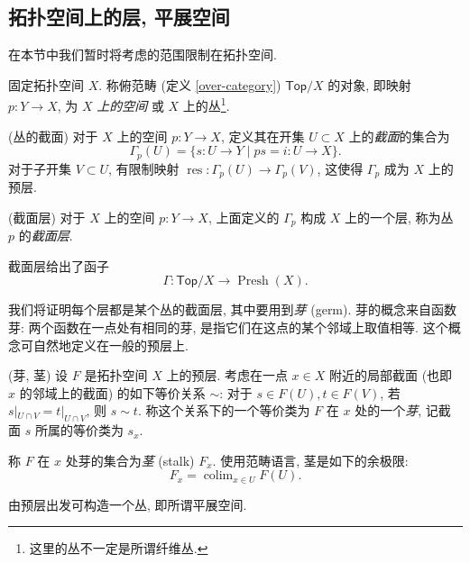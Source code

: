 


\subsection{拓扑空间上的层, 平展空间}

在本节中我们暂时将考虑的范围限制在拓扑空间.

固定拓扑空间 $X$. 称俯范畴 (定义 \ref{over-category}) $\mathsf {Top}/X$ 的对象, 即映射 $p \colon Y \to X$, 为 $X$ \emph{上的空间} 或 $X$ 上的丛\footnote{这里的丛不一定是所谓纤维丛.}.

\begin{definition}
    {(丛的截面)}
    对于 $X$ 上的空间 $p \colon Y\to X$, 定义其在开集 $U\subset X$ 上的\emph{截面}的集合为
    $$
    \Gamma_p(U)=
    \big\{
        s \colon U \to Y \mid ps=i\colon U \to X
    \big\}.
    $$
    对于子开集 $V\subset U$, 有限制映射 $\operatorname{res}\colon \Gamma_p(U) \to \Gamma_p(V)$, 这使得 $\Gamma_p$ 成为 $X$ 上的预层.
\end{definition}

\begin{propdef}
    {(截面层)}
    对于 $X$ 上的空间 $p \colon Y\to X$, 上面定义的 $\Gamma_p$ 构成 $X$ 上的一个层, 称为丛 $p$ 的\emph{截面层}.
    
    截面层给出了函子
    $$\Gamma \colon \mathsf {Top}/X \to \operatorname{Presh}(X).$$
\end{propdef}

我们将证明每个层都是某个丛的截面层, 其中要用到\emph{芽} (germ).
芽的概念来自函数芽: 两个函数在一点处有相同的芽, 是指它们在这点的某个邻域上取值相等. 这个概念可自然地定义在一般的预层上.

\begin{definition}
	[label={germ-and-stalk}]
	{(芽, 茎)}
    设 $F$ 是拓扑空间 $X$ 上的预层. 考虑在一点 $x\in X$ 附近的局部截面 (也即 $x$ 的邻域上的截面) 的如下等价关系 $\sim$: 对于 $s\in F(U),t\in F(V)$, 若 $s|_{U\cap V}=t|_{U\cap V}$, 则 $s\sim t$. 称这个关系下的一个等价类为 $F$ 在 $x$ 处的一个\emph{芽}, 记截面 $s$ 所属的等价类为 $s_x$.
    
    称 $F$ 在 $x$ 处芽的集合为\emph{茎} (stalk) $F_x$.
    使用范畴语言, 茎是如下的余极限:
    $$
    F_x = \operatorname{colim}_{x\in U}F(U).
    $$
\end{definition}

由预层出发可构造一个丛, 即所谓平展空间.


